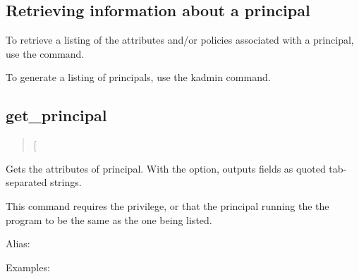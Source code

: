 \documentclass[letterpaper,10pt,english]{sphinxmanual}
\begin{document}
\subsection{Retrieving information about a principal}
\label{\detokenize{admin/database:retrieving-information-about-a-principal}}
To retrieve a listing of the attributes and/or policies associated
with a principal, use the {\hyperref[\detokenize{admin/admin_commands/kadmin_local:kadmin-1}]{}}  command.

To generate a listing of principals, use the kadmin
 command.


\subsection{get\_principal}
\label{\detokenize{admin/database:get-principal}}\begin{quote}

 {[}\sphinxstylestrong{-terse}{]} 
\end{quote}

Gets the attributes of principal.  With the  option, outputs
fields as quoted tab-separated strings.

This command requires the  privilege, or that the principal
running the the program to be the same as the one being listed.

Alias: 

Examples:
\end{document}
